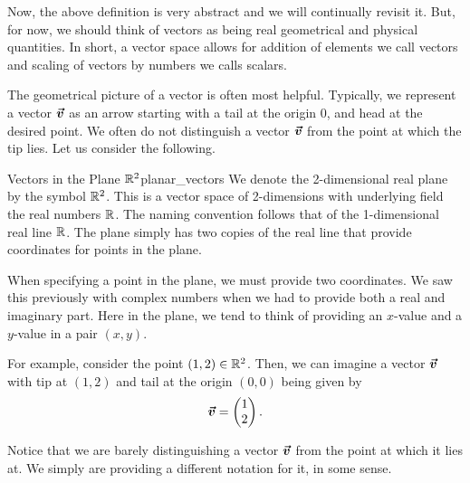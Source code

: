         Now, the above definition is very abstract and we will continually revisit it. But, for now, we should think of vectors as being real geometrical and physical quantities.   In short, a vector space allows for addition of elements we call vectors and scaling of vectors by numbers we calls scalars. 
        
        The geometrical picture of a vector is often most helpful.  Typically, we represent a vector $\boldsymbol{\boldsymbol{\vec{v}}}$ as an arrow starting with a tail at the origin 0, and head at the desired point. We often do not distinguish a vector $\boldsymbol{\boldsymbol{\vec{v}}}$ from the point at which the tip lies.  Let us consider the following.
        
        \begin{ex}{Vectors in the Plane $\mathbb{R}^2$}{planar_vectors}
            We denote the 2-dimensional real plane by the symbol $\mathbb{R}^2$. This is a vector space of 2-dimensions with underlying field the real numbers $\mathbb{R}$. The naming convention follows that of the 1-dimensional real line $\mathbb{R}$.  The plane simply has two copies of the real line that provide coordinates for points in the plane.
            
            When specifying a point in the plane, we must provide two coordinates. We saw this previously with complex numbers when we had to provide both a real and imaginary part.  Here in the plane, we tend to think of providing an $x$-value and a $y$-value in a pair $(x,y)$.  
            
            For example, consider the point $(1,2)\in \mathbb{R}^2$.  Then, we can imagine a vector $\boldsymbol{\boldsymbol{\vec{v}}}$ with tip at $(1,2)$ and tail at the origin $(0,0)$ being given by
            \[
            \boldsymbol{\boldsymbol{\vec{v}}} = \begin{pmatrix} 1 \\ 2 \end{pmatrix}.
            \]
        \begin{center}
        \end{center}
        
            Notice that we are barely distinguishing a vector $\boldsymbol{\boldsymbol{\vec{v}}}$ from the point at which it lies at.  We simply are providing a different notation for it, in some sense.
        \end{ex}
        

